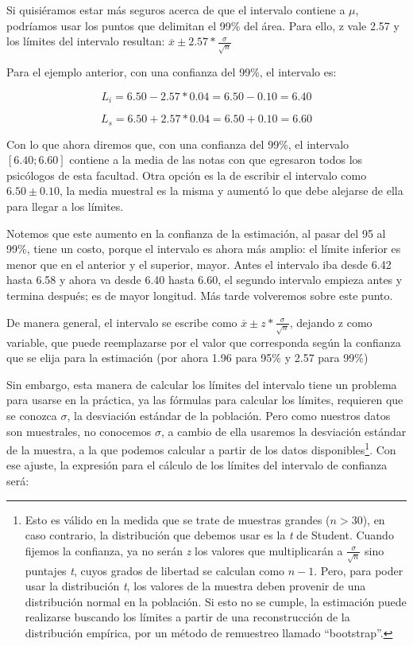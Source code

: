 \documentclass[]{book}
\let\rmarkdownfootnote\footnote%
\def\footnote{\protect\rmarkdownfootnote}
\begin{document}
Si quisiéramos estar más seguros acerca de que el intervalo contiene a
\(\mu\), podríamos usar los puntos que delimitan el 99\% del área. Para
ello, z vale 2.57 y los límites del intervalo resultan:
\(\overline{x} \pm 2.57*\frac{\sigma}{\sqrt{n}}\)

Para el ejemplo anterior, con una confianza del 99\%, el intervalo es:

\[L_{i} = 6.50 - 2.57*0.04 = 6.50 - 0.10 = 6.40\]

\[L_{s} = 6.50 + 2.57*0.04 = 6.50 + 0.10 = 6.60\]

Con lo que ahora diremos que, con una confianza del 99\%, el intervalo
\([6.40; 6.60]\) contiene a la media de las notas con que egresaron todos
los psicólogos de esta facultad. Otra opción es la de escribir el
intervalo como \(6.50 \pm 0.10\), la media muestral es la misma y aumentó
lo que debe alejarse de ella para llegar a los límites.

Notemos que este aumento en la confianza de la estimación, al pasar del
95 al 99\%, tiene un costo, porque el intervalo es ahora más amplio: el
límite inferior es menor que en el anterior y el superior, mayor. Antes
el intervalo iba desde 6.42 hasta 6.58 y ahora va desde 6.40 hasta 6.60, el segundo intervalo empieza antes y termina después; es de mayor longitud. Más tarde volveremos sobre este punto.

De manera general, el intervalo se escribe como
\(\overline{x} \pm z*\frac{\sigma}{\sqrt{n}}\), dejando z como variable,
que puede reemplazarse por el valor que corresponda según la confianza
que se elija para la estimación (por ahora 1.96 para 95\% y 2.57 para
99\%)

Sin embargo, esta manera de calcular los límites del intervalo tiene un
problema para usarse en la práctica, ya las fórmulas para calcular los
límites, requieren que se conozca \(\sigma\), la desviación estándar de la
población. Pero como nuestros datos son muestrales, no conocemos
\(\sigma\), a cambio de ella usaremos la desviación estándar de la
muestra, a la que podemos calcular a partir de los datos
disponibles\footnote{Esto es válido en la medida que se trate de muestras grandes (\(n > 30\)), en caso contrario, la distribución que debemos usar es la \emph{t} de Student. Cuando fijemos la confianza, ya no serán \emph{z} los valores que multiplicarán a \(\frac{\sigma}{\sqrt{n}}\) sino puntajes \emph{t}, cuyos grados de libertad se calculan como \(n-1\). Pero, para poder usar la distribución \emph{t}, los valores de la muestra deben provenir de una distribución normal en la población. Si esto no se cumple, la estimación puede realizarse buscando los límites a partir de una reconstrucción de la distribución empírica, por un método de remuestreo llamado ``bootstrap''.}. Con ese ajuste, la expresión para el cálculo de los
límites del intervalo de confianza será:
\end{document}
